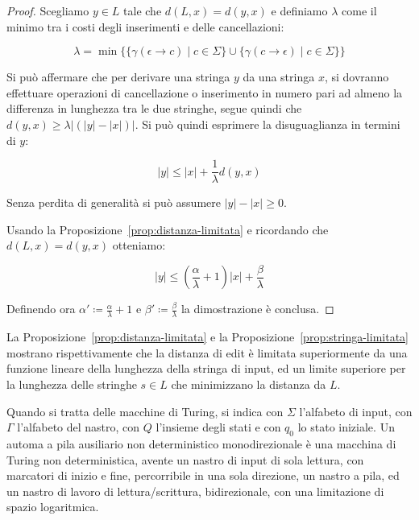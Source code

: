 \documentclass[a4paper,12pt]{report}
\theoremstyle{propositionstyle}
\begin{document}
    \begin{proof}
        Scegliamo $y \in L$ tale che $d\left(L, x\right) = d\left(y, x\right)$ e definiamo $\lambda$ come il minimo tra i costi degli inserimenti e delle cancellazioni:

        $$ \lambda = \min\bigl\{\{\gamma\left(\epsilon \rightarrow c\right) \mid c \in \Sigma\} \cup \{\gamma\left(c \rightarrow \epsilon\right) \mid c \in \Sigma\}\bigr\}$$

        Si può affermare che per derivare una stringa $y$ da una stringa $x$, si dovranno effettuare operazioni di cancellazione o inserimento in numero pari
        ad almeno la differenza in lunghezza tra le due stringhe, segue quindi che $d\left(y, x\right) \geq \lambda\bigl|\left(\lvert y \rvert - \lvert x \rvert\right)\bigr|$.
        Si può quindi esprimere la disuguaglianza in termini di $y$:

        $$\lvert y \rvert \leq \lvert x \rvert + \frac{1}{\lambda}d\left(y, x\right)$$

        Senza perdita di generalità si può assumere $\lvert y \rvert - \lvert x \rvert \geq 0$.

        Usando la Proposizione~\ref{prop:distanza-limitata} e ricordando che $d\left(L, x\right) = d\left(y, x\right)$ otteniamo:

        $$\lvert y \rvert \leq \left(\frac{\alpha}{\lambda} + 1\right)\lvert x \rvert + \frac{\beta}{\lambda}$$
        \vspace{0.5em}

        Definendo ora $\displaystyle \alpha' \coloneqq \frac{\alpha}{\lambda} + 1$ e $\displaystyle \beta' \coloneqq \frac{\beta}{\lambda}$ la dimostrazione è conclusa.
    \end{proof}

    La Proposizione~\ref{prop:distanza-limitata} e la Proposizione~\ref{prop:stringa-limitata} mostrano rispettivamente che la distanza di edit è limitata superiormente da una funzione lineare della lunghezza della stringa di input, ed un limite superiore per la lunghezza delle stringhe $s \in L$ che minimizzano la distanza da $L$.

    Quando si tratta delle macchine di Turing, si indica con $\Sigma$ l'alfabeto di input, con $\Gamma$ l'alfabeto del nastro, con $Q$ l'insieme degli stati
    e con $q_0$ lo stato iniziale.
    Un automa a pila ausiliario non deterministico monodirezionale è una macchina di Turing non deterministica,
    avente un nastro di input di sola lettura, con marcatori di inizio e fine, percorribile in una sola direzione, un nastro a pila,
    ed un nastro di lavoro di lettura/scrittura, bidirezionale, con una limitazione di spazio logaritmica.
\end{document}
